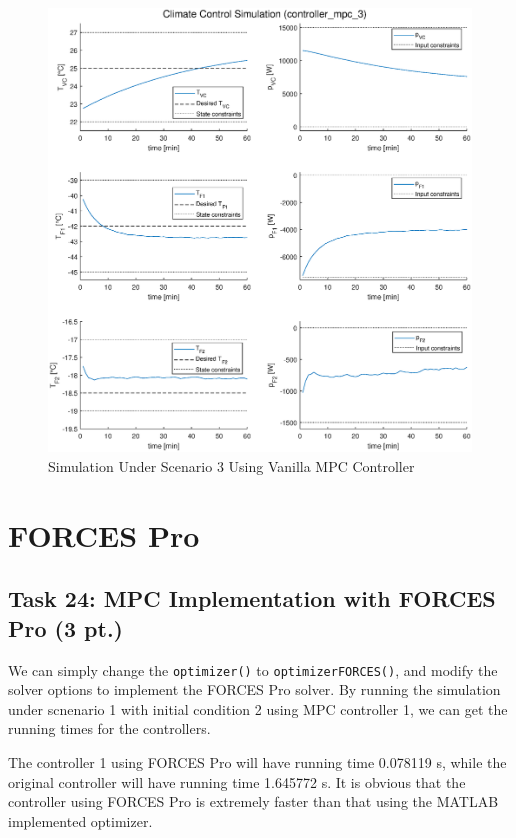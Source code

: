 \documentclass[a4paper,twoside,11pt]{article}
\numberwithin{equation}{section}
\begin{document}
\newpage

\begin{figure}[ht]
\centering
\includegraphics[scale = 0.58]{image/23-2.eps}
\caption{Simulation Under Scenario 3 Using Vanilla MPC Controller}
\label{fig:21}
\end{figure}

\newpage


\section{FORCES Pro}

\subsection{Task 24: MPC Implementation with FORCES Pro (3 pt.)}


We can simply change the \verb|optimizer()| to \verb|optimizerFORCES()|, and modify the solver options to implement the FORCES Pro solver. By running the simulation under scnenario 1 with initial condition 2 using MPC controller 1, we can get the running times for the controllers. 

The controller 1 using FORCES Pro will have running time 0.078119 s, while the original controller will have running time 1.645772 s. It is obvious that the controller using FORCES Pro is extremely faster than that using the MATLAB implemented optimizer. 
\end{document}
